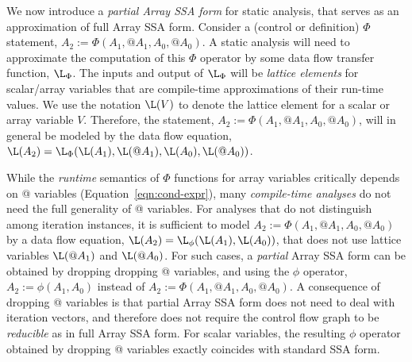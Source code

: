 We now introduce a {\it partial Array SSA form} for static analysis,
that serves as an approximation of full Array SSA form.
Consider a (control or definition) $\Phi$ statement, $A_2 := \Phi(A_1, @A_1, A_0, @A_0)$.
A static analysis will need to 
approximate
the computation of this $\Phi$ operator by 
some data flow transfer function, $\L_{\Phi}$.
The inputs and output of $\L_{\Phi}$ will be
{\it lattice elements} for scalar/array variables that
are compile-time approximations of their run-time values.
We use the notation $\L(V)$ to denote the lattice element for 
a scalar or array
variable $V$.
Therefore, the 
statement, $A_2 := \Phi(A_1, @A_1, A_0, @A_0)$, will in general
be modeled by the data flow equation,
$\L(A_2) = \L_{\Phi}(\L(A_1), \L(@A_1), \L(A_0), \L(@A_0))$.

While the  {\em runtime} semantics of 
$\Phi$ functions for array variables critically depends on @ variables (Equation~\ref{eqn:cond-expr}),
many {\em compile-time analyses} do not need the full generality of @ variables.  
For analyses that do not distinguish among iteration instances,
it is sufficient to model
$A_2 := \Phi(A_1, @A_1, A_0, @A_0)$ by
a data flow equation, $\L(A_2) = \L_{\phi}(\L(A_1), \L(A_0))$,
that does not use lattice variables $\L(@A_1)$ and $\L(@A_0)$.
For such cases, a {\it partial}
Array SSA form can be obtained by dropping 
dropping @ variables, and using the
$\phi$ operator, $A_2 := \phi(A_1, A_0)$ instead of
$A_2 := \Phi(A_1, @A_1, A_0, @A_0)$.  
A consequence of dropping @ variables is that partial Array
SSA form does not need to deal with iteration
vectors, and therefore does not require the control flow graph to be {\it reducible} as in full Array SSA form.
For scalar variables, the resulting $\phi$ operator obtained by
dropping @ variables exactly coincides with standard SSA form.




